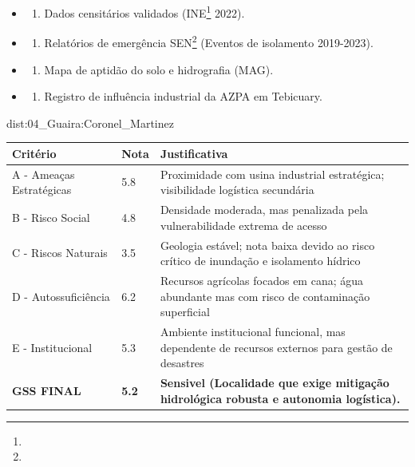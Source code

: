 {\begin{itemize}
\tightlist
\item
  \begin{enumerate}
  \def\labelenumi{\arabic{enumi})}
  \tightlist
  \item
    Dados censitários validados (INE\footnote{\fineINE} 2022).
  \end{enumerate}
\item
  \begin{enumerate}
  \def\labelenumi{\arabic{enumi})}
  \setcounter{enumi}{1}
  \tightlist
  \item
    Relatórios de emergência SEN\footnote{\fineSEN} (Eventos de isolamento 2019-2023).
  \end{enumerate}
\item
  \begin{enumerate}
  \def\labelenumi{\arabic{enumi})}
  \setcounter{enumi}{2}
  \tightlist
  \item
    Mapa de aptidão do solo e hidrografia (MAG).
  \end{enumerate}
\item
  \begin{enumerate}
  \def\labelenumi{\arabic{enumi})}
  \setcounter{enumi}{3}
  \tightlist
  \item
    Registro de influência industrial da AZPA em Tebicuary.
  \end{enumerate}
\end{itemize}}{dist:04_Guaira:Coronel_Martinez}
\begin{table}[ht!]
\small \begin{tabular}{p{3.0cm}p{0.8cm}p{6.0cm}} \toprule
\textbf{Critério} & \textbf{Nota} & \textbf{Justificativa} \\ \midrule
A - Ameaças Estratégicas & 5.8 & Proximidade com usina industrial estratégica; visibilidade logística secundária \\
B - Risco Social & 4.8 & Densidade moderada, mas penalizada pela vulnerabilidade extrema de acesso \\
C - Riscos Naturais & 3.5 & Geologia estável; nota baixa devido ao risco crítico de inundação e isolamento hídrico \\
D - Autossuficiência & 6.2 & Recursos agrícolas focados em cana; água abundante mas com risco de contaminação superficial \\
E - Institucional & 5.3 & Ambiente institucional funcional, mas dependente de recursos externos para gestão de desastres \\
\midrule \textbf{GSS FINAL} & \textbf{5.2} & \textbf{Sensivel (Localidade que exige mitigação hidrológica robusta e autonomia logística).} \\ \bottomrule \end{tabular}
\end{table}
